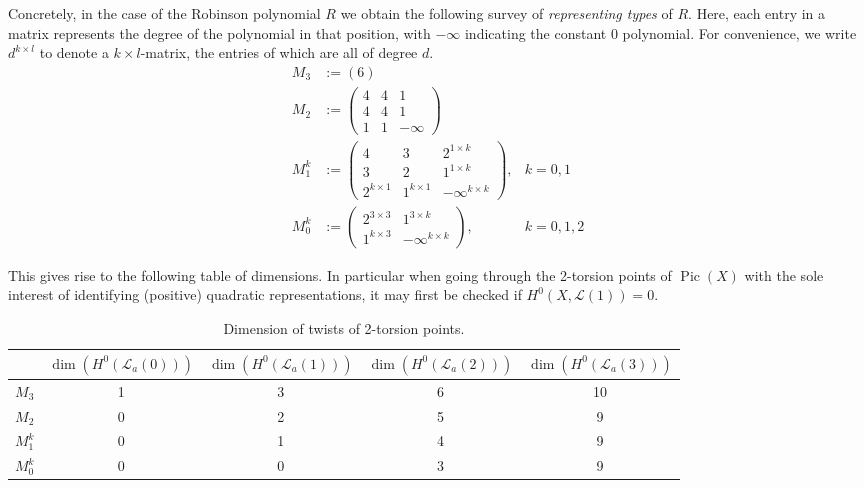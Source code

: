 \documentclass[a4paper,10pt]{amsart}
\theoremstyle{definition}
\theoremstyle{plain}
\newcommand{\Pic}{\operatorname{Pic}}
\newcommand{\cL}{{\mathcal L}}
\begin{document}
Concretely, in the case of the Robinson polynomial $R$ we obtain the following survey of \emph{representing types} of $R$. Here, each entry in a matrix represents the degree of the polynomial in that position, with $-\infty$ indicating the constant 0 polynomial. For convenience, we write $d^{k\times l}$ to denote a $k \times l$-matrix, the entries of which are all of degree $d$.
\begin{align*}
    M_3 &:= (6) \\
    M_2 &:= \begin{pmatrix}
    4 & 4 & 1 \\
    4 & 4 & 1 \\
    1 & 1 & -\infty
    \end{pmatrix} \\
    M_1^k &:= \begin{pmatrix}
    4 & 3 & 2^{1\times k} \\
    3 & 2 & 1^{1\times k} \\
    2^{k\times1} & 1^{k\times1} & -\infty^{k\times k}
    \end{pmatrix}, &k = 0, 1 \\
    M_0^k &:= \begin{pmatrix}
    2^{3\times3} & 1^{3 \times k} \\
    1^{k \times 3} & -\infty^{k \times k}
    \end{pmatrix}, &k = 0, 1, 2
\end{align*}


This gives rise to the following table of dimensions. In particular when going through the 2-torsion points of $\Pic(X)$ with the sole interest of identifying (positive) quadratic representations,  it may first be checked if $H^0(X, \cL(1)) = 0$.

\begin{table}[h]
    \centering
    \begin{tabular}{c|c|c|c|c}
        & $\dim(H^0(\cL_a(0)))$ & $\dim(H^0(\cL_a(1)))$ & $\dim(H^0(\cL_a(2)))$ & $\dim(H^0(\cL_a(3)))$ \\ \hline
        $M_3$ & 1 & 3 & 6 & 10\\
        $M_2$ & 0 & 2 & 5 & 9\\
        $M_1^k$ & 0 & 1 & 4 & 9 \\
        $M_0^k$ & 0 & 0 & 3 & 9
    \end{tabular}
    \caption{Dimension of twists of 2-torsion points.}
    \label{tab:twistcohom}
\end{table}
\end{document}
